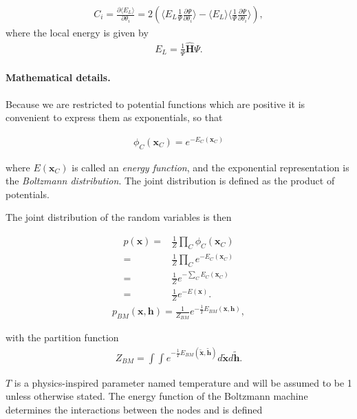 \documentclass[%
oneside,                 %
final,                   %
10pt]{article}
\begin{document}
\begin{align}
	C_i = \frac{\partial \langle E_L \rangle}{\partial \theta_i}
	= 2(\langle E_L \frac{1}{\Psi}\frac{\partial \Psi}{\partial \theta_i} \rangle - \langle E_L \rangle \langle \frac{1}{\Psi}\frac{\partial \Psi}{\partial \theta_i} \rangle ),
\end{align}
where the local energy is given by
\begin{align}
	E_L = \frac{1}{\Psi} \hat{\mathbf{H}} \Psi.
\end{align}

\paragraph{Mathematical details.}
Because we are restricted to potential functions which are positive it
is convenient to express them as exponentials, so that

\begin{align}
	\phi_C (\bm{x}_C) = e^{-E_C(\bm{x}_C)}
\end{align}

where $E(\bm{x}_C)$ is called an \emph{energy function}, and the
exponential representation is the \emph{Boltzmann distribution}. The
joint distribution is defined as the product of potentials.

The joint distribution of the random variables is then

\begin{align}
	p(\bm{x}) =& \frac{1}{Z} \prod_C \phi_C (\bm{x}_C) \nonumber \\
	=& \frac{1}{Z} \prod_C e^{-E_C(\bm{x}_C)} \nonumber \\
	=& \frac{1}{Z} e^{-\sum_C E_C(\bm{x}_C)} \nonumber \\
	=& \frac{1}{Z} e^{-E(\bm{x})}.
\end{align} 
\begin{align}
	p_{BM}(\bm{x}, \bm{h}) = \frac{1}{Z_{BM}} e^{-\frac{1}{T}E_{BM}(\bm{x}, \bm{h})} ,
\end{align}

with the partition function 
\begin{align}
	Z_{BM} = \int \int e^{-\frac{1}{T} E_{BM}(\tilde{\bm{x}}, \tilde{\bm{h}})} d\tilde{\bm{x}} d\tilde{\bm{h}} .
\end{align}

$T$ is a physics-inspired parameter named temperature and will be assumed to be 1 unless otherwise stated. The energy function of the Boltzmann machine determines the interactions between the nodes and is defined  
\end{document}
